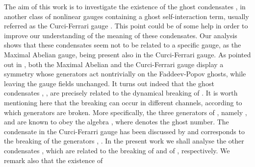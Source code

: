 \documentclass[a4paper,12pt]{article}
\begin{document}
The aim of this work is to investigate the existence of the ghost
condensates \coordHE{}, \coordHE{} in another class of nonlinear gauges 
\cite{dj} containing a ghost self-interaction term, usually referred as the
Curci-Ferrari gauge \cite{cf,ds,r}. This point could be of some help in
order to improve our understanding of the meaning of these condensates. Our
analysis shows that these condensates seem not to be related to a specific
gauge, as the Maximal Abelian gauge, being present also in the Curci-Ferrari
gauge. As pointed out in \cite{sl2r}, both the Maximal Abelian and the
Curci-Ferrari gauge display a \coordHE{} symmetry whose generators act
nontrivially on the Faddeev-Popov ghosts, while leaving the gauge fields
unchanged. It turns out indeed that the ghost condensates \coordHE{}, \coordHE{}%
, \coordHE{} are precisely related to the dynamical breaking of \coordHE{}%
. It is worth mentioning here that the breaking can occur in different
channels, according to which generators are broken. More specifically, the
three generators of \coordHE{}, namely \myHighlight{$\delta $}\coordHE{}, \myHighlight{$\overline{\delta }$}\coordHE{} and \coordHE{}are known \cite{oj} to obey the algebra \myHighlight{$\left[ \delta ,%
\overline{\delta }\right] =$}\coordHE{}  \coordHE{}, where \coordHE{} denotes
the ghost number. The condensate \coordHE{} in the Curci-Ferarri gauge has been
discussed by \cite{k1} and corresponds to the breaking of the generators \myHighlight{$%
\delta $}\coordHE{}, \myHighlight{$\overline{\delta }$}\coordHE{}. In the present work we shall analyse the
other condensates \coordHE{}, \coordHE{} which are related to the breaking of \coordHE{} and of \coordHE{}, respectively. We remark also that the existence of
\end{document}
